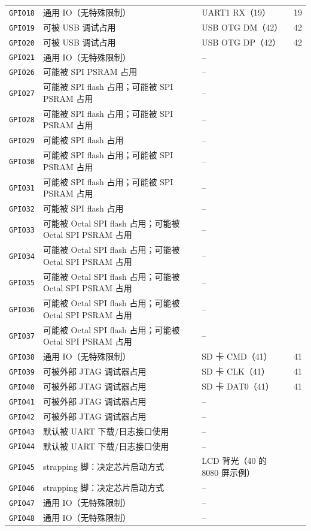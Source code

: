 \documentclass[UTF8,a4paper,11pt,fontset=fandol]{ctexart}
\newcommand{\fld}[1]{\texttt{#1}}
\begin{document}
\begin{center}
\begin{longtable}{@{}p{1.4cm}>{\raggedright\arraybackslash}p{5.2cm}>{\raggedright\arraybackslash}p{5.2cm}p{1.4cm}@{}}
\fld{GPIO18} & 通用 IO（无特殊限制） & UART1 RX（19） & 19 \\
\fld{GPIO19} & 可被 USB 调试占用 & USB OTG DM（42） & 42 \\
\fld{GPIO20} & 可被 USB 调试占用 & USB OTG DP（42） & 42 \\
\fld{GPIO21} & 通用 IO（无特殊限制） & -- &  \\
\fld{GPIO26} & 可能被 SPI PSRAM 占用 & -- &  \\
\fld{GPIO27} & 可能被 SPI flash 占用；可能被 SPI PSRAM 占用 & -- &  \\
\fld{GPIO28} & 可能被 SPI flash 占用；可能被 SPI PSRAM 占用 & -- &  \\
\fld{GPIO29} & 可能被 SPI flash 占用 & -- &  \\
\fld{GPIO30} & 可能被 SPI flash 占用；可能被 SPI PSRAM 占用 & -- &  \\
\fld{GPIO31} & 可能被 SPI flash 占用；可能被 SPI PSRAM 占用 & -- &  \\
\fld{GPIO32} & 可能被 SPI flash 占用 & -- &  \\
\fld{GPIO33} & 可能被 Octal SPI flash 占用；可能被 Octal SPI PSRAM 占用 & -- &  \\
\fld{GPIO34} & 可能被 Octal SPI flash 占用；可能被 Octal SPI PSRAM 占用 & -- &  \\
\fld{GPIO35} & 可能被 Octal SPI flash 占用；可能被 Octal SPI PSRAM 占用 & -- &  \\
\fld{GPIO36} & 可能被 Octal SPI flash 占用；可能被 Octal SPI PSRAM 占用 & -- &  \\
\fld{GPIO37} & 可能被 Octal SPI flash 占用；可能被 Octal SPI PSRAM 占用 & -- &  \\
\fld{GPIO38} & 通用 IO（无特殊限制） & SD 卡 CMD（41） & 41 \\
\fld{GPIO39} & 可被外部 JTAG 调试器占用 & SD 卡 CLK（41） & 41 \\
\fld{GPIO40} & 可被外部 JTAG 调试器占用 & SD 卡 DAT0（41） & 41 \\
\fld{GPIO41} & 可被外部 JTAG 调试器占用 & -- &  \\
\fld{GPIO42} & 可被外部 JTAG 调试器占用 & -- &  \\
\fld{GPIO43} & 默认被 UART 下载/日志接口使用 & -- &  \\
\fld{GPIO44} & 默认被 UART 下载/日志接口使用 & -- &  \\
\fld{GPIO45} & strapping 脚：决定芯片启动方式 & LCD 背光（40 的 8080 屏示例） &  \\
\fld{GPIO46} & strapping 脚：决定芯片启动方式 & -- &  \\
\fld{GPIO47} & 通用 IO（无特殊限制） & -- &  \\
\fld{GPIO48} & 通用 IO（无特殊限制） & -- &  \\
\end{longtable}
\end{center}
\end{document}
